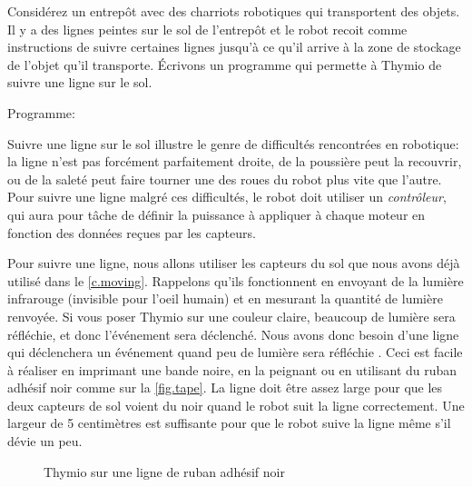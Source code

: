\label{ch.line}

Considérez un entrepôt avec des charriots robotiques qui transportent des objets.
Il y a des lignes peintes sur le sol de l'entrepôt et le robot recoit comme instructions de suivre certaines lignes jusqu'à ce qu'il arrive à la zone de stockage de l'objet qu'il transporte.
Écrivons un programme qui permette à Thymio de suivre une ligne sur le sol.

{\raggedleft \hfill Programme: }

Suivre une ligne sur le sol illustre le genre de difficultés rencontrées en robotique:
la ligne n'est pas forcément parfaitement droite,
de la poussière peut la recouvrir, ou de la saleté peut faire tourner une des roues du robot plus vite que l'autre.
Pour suivre une ligne malgré ces difficultés,
le robot doit utiliser un \emph{contrôleur}, qui aura pour tâche de définir la puissance à appliquer à chaque moteur en fonction des données reçues par les capteurs.


Pour suivre une ligne, nous allons utiliser les capteurs du sol que nous avons déjà utilisé dans le \cref{c.moving}.
Rappelons qu'ils fonctionnent en envoyant de la lumière infrarouge (invisible pour l'oeil humain) et en mesurant la quantité de lumière renvoyée.
Si vous poser Thymio sur une couleur claire, beaucoup de lumière sera réfléchie, et donc l'événement  sera déclenché.
Nous avons donc besoin d'une ligne qui déclenchera un événement quand peu de lumière sera réfléchie .
Ceci est facile à réaliser en imprimant une bande noire, en la peignant ou en utilisant du ruban adhésif noir comme sur la \cref{fig.tape}.
La ligne doit être assez large pour que les deux capteurs de sol voient du noir quand le robot suit la ligne correctement.
Une largeur de 5 centimètres est suffisante pour que le robot suive la ligne même s'il dévie un peu.

\begin{figure}
    \hfill
    \caption{Thymio sur une ligne de ruban adhésif noir}
\end{figure}



